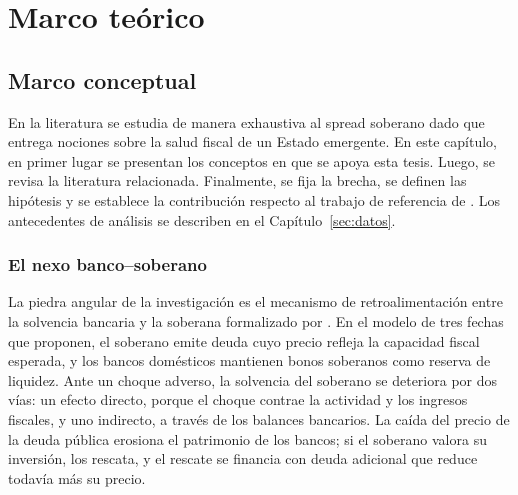 \chapter{Marco teórico}
\label{sec:marco}

\section{Marco conceptual}
\label{sec:marco-conceptual}

En la literatura se estudia de manera exhaustiva al spread soberano dado que entrega nociones sobre la salud fiscal de un Estado emergente. En este capítulo, en primer lugar se presentan los conceptos en que se apoya esta tesis. Luego, se revisa la literatura relacionada. Finalmente, se fija la brecha, se definen las hipótesis y se establece la contribución respecto al trabajo de referencia de \citet{Chari2024b}. Los antecedentes de análisis se describen en el Capítulo~\ref{sec:datos}.

\subsection{El nexo banco--soberano}
\label{sec:marco-nexo}

La piedra angular de la investigación es el mecanismo de retroalimentación entre la solvencia bancaria y la soberana formalizado por \citet{FarhiTirole2018b}. En el modelo de tres fechas que proponen, el soberano emite deuda cuyo precio refleja la capacidad fiscal esperada, y los bancos domésticos mantienen bonos soberanos como reserva de liquidez. Ante un choque adverso, la solvencia del soberano se deteriora por dos vías: un efecto directo, porque el choque contrae la actividad y los ingresos fiscales, y uno indirecto, a través de los balances bancarios. La caída del precio de la deuda pública erosiona el patrimonio de los bancos; si el soberano valora su inversión, los rescata, y el rescate se financia con deuda adicional que reduce todavía más su precio.

